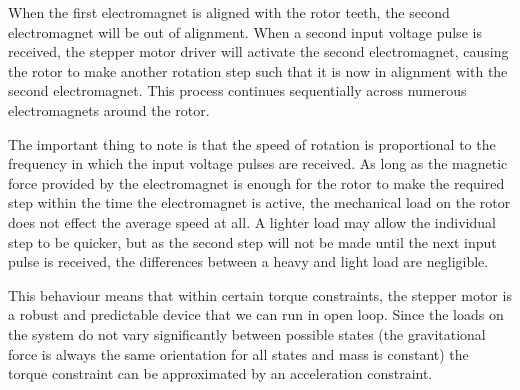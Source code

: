 		When the first electromagnet is aligned with the rotor teeth, the second electromagnet will be out of alignment. When a second input voltage pulse is received, the stepper motor driver will activate the second electromagnet, causing the rotor to make another rotation step such that it is now in alignment with the second electromagnet. This process continues sequentially across numerous electromagnets around the rotor.
		
		The important thing to note is that the speed of rotation is proportional to the frequency in which the input voltage pulses are received. As long as the magnetic force provided by the electromagnet is enough for the rotor to make the required step within the time the electromagnet is active, the mechanical load on the rotor does not effect the average speed at all. A lighter load may allow the individual step to be quicker, but as the second step will not be made until the next input pulse is received, the differences between a heavy and light load are negligible.
		
		This behaviour means that within certain torque constraints, the stepper motor is a robust and predictable device that we can run in open loop. Since the loads on the system do not vary significantly between possible states (the gravitational force is always the same orientation for all states and mass is constant) the torque constraint can be approximated by an acceleration constraint.